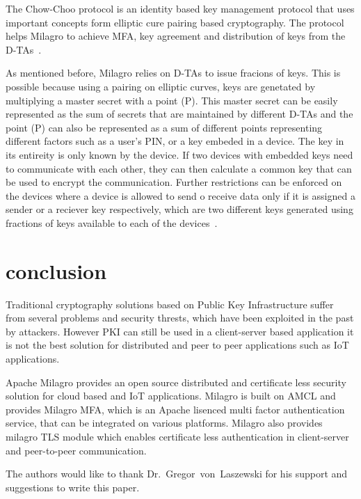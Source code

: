 The Chow-Choo protocol is an identity based key management protocol
that uses important concepts form elliptic cure pairing based
cryptography. The protocol helps Milagro to achieve MFA, key agreement
and distribution of keys from the D-TAs~\cite{milagro-protocols}.


As mentioned before, Milagro relies on D-TAs to issue fracions of
keys. This is possible because using a pairing on elliptic curves,
keys are genetated by multiplying a master secret with a point
(P). This master secret can be easily represented as the sum of
secrets that are maintained by different D-TAs and the point (P) can
also be represented as a sum of different points representing
different factors such as a user's PIN, or a key embeded in a
device. The key in its entireity is only known by the device. If two
devices with embedded keys need to communicate with each other, they
can then calculate a common key that can be used to encrypt the
communication. Further restrictions can be enforced on the devices
where a device is allowed to send o receive data only if it is
assigned a sender or a reciever key respectively, which are two
different keys generated using fractions of keys available to each of
the devices~\cite{milagro-protocols}.

\section{conclusion}
Traditional cryptography solutions based on Public Key Infrastructure
suffer from several problems and security thrests, which have been
exploited in the past by attackers. However PKI can still be used in a
client-server based application it is not the best solution for
distributed and peer to peer applications such as IoT applications.

Apache Milagro provides an open source distributed and certificate
less security solution for cloud based and IoT applications. Milagro
is built on AMCL and provides Milagro MFA, which is an Apache lisenced
multi factor authentication service, that can be integrated on various
platforms. Milagro also provides milagro TLS module which enables
certificate less authentication in client-server and peer-to-peer
communication.

\begin{acks}

  The authors would like to thank Dr.~Gregor~von~Laszewski for his
  support and suggestions to write this paper.

\end{acks}




 
